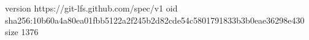 version https://git-lfs.github.com/spec/v1
oid sha256:10b60a4a80ea01fbb5122a2f245b2d82cde54c5801791833b3b0eae36298e430
size 1376
